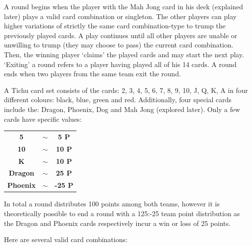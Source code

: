 A round begins when the player with the Mah Jong card in his deck (explained later) plays a valid card combination or singleton. The other players can play higher variations of strictly the same card combination-type to trump the previously played cards. A play continues until all other players are unable or unwilling to trump (they may choose to pass) the current card combination. Then, the winning player ‘claims’ the played cards and may start the next play. ‘Exiting’ a round refers to a player having played all of his 14 cards. A round ends when two players from the same team exit the round.


A Tichu card set consists of the cards: 2, 3, 4, 5, 6, 7, 8, 9, 10, J, Q, K, A in four different colours: black, blue, green and red. Additionally, four special cards include the: Dragon, Phoenix, Dog and Mah Jong (explored later). Only a few cards have specific values:\\
\begin{scriptsize}
\begin{center}
\begin{tabular}{ c c c }
\textbf{5} & $\sim$  & \textbf{5 P} \\
\textbf{10} & $\sim$ & \textbf{10 P} \\
\textbf{K} & $\sim$  & \textbf{10 P} \\
\textbf{Dragon} & $\sim$ & \textbf{25 P} \\
\textbf{Phoenix} & $\sim$ & \textbf{-25 P}
\end{tabular}
\end{center}
\end{scriptsize}
In total a round distributes 100 points among both teams, however it is theoretically possible to end a round with a 125:-25 team point distribution as the Dragon and Phoenix cards respectively incur a win or loss of 25 points.

Here are several valid card combinations:
\\
\\

